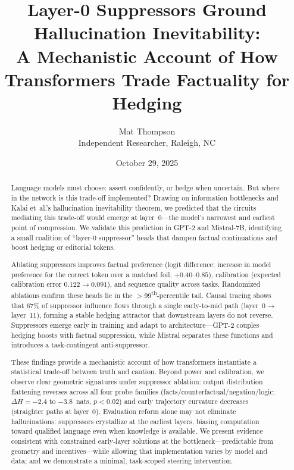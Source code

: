 \documentclass[11pt]{article}
\title{Layer-0 Suppressors Ground Hallucination Inevitability:\\A Mechanistic Account of How Transformers Trade Factuality for Hedging}
\author{Mat Thompson\\Independent Researcher, Raleigh, NC}
\date{October 29, 2025}
\begin{document}
\maketitle

\begin{abstract}
Language models must choose: assert confidently, or hedge when uncertain. But where in the network is this trade-off implemented? Drawing on information bottlenecks and Kalai et~al.'s hallucination inevitability theorem, we predicted that the circuits mediating this trade-off would emerge at layer~0—the model’s narrowest and earliest point of compression. We validate this prediction in GPT-2 and Mistral-7B, identifying a small coalition of “layer-0 suppressor” heads that dampen factual continuations and boost hedging or editorial tokens.

Ablating suppressors improves factual preference (logit difference: increase in model preference for the correct token over a matched foil, $+0.40$–$0.85$), calibration (expected calibration error $0.122\rightarrow0.091$), and sequence quality across tasks. Randomized ablations confirm these heads lie in the $>99$\textsuperscript{th}-percentile tail. Causal tracing shows that $67\%$ of suppressor influence flows through a single early-to-mid path (layer~0$\rightarrow$layer~11), forming a stable hedging attractor that downstream layers do not reverse. Suppressors emerge early in training and adapt to architecture—GPT-2 couples hedging boosts with factual suppression, while Mistral separates these functions and introduces a task-contingent anti-suppressor.

These findings provide a mechanistic account of how transformers instantiate a statistical trade-off between truth and caution. Beyond power and calibration, we observe clear geometric signatures under suppressor ablation: output distribution flattening reverses across all four probe families (facts/counterfactual/negation/logic; $\Delta H = -2.4$ to $-3.8$~nats, $p<0.02$) and early trajectory curvature decreases (straighter paths at layer~0). Evaluation reform alone may not eliminate hallucinations: suppressors crystallize at the earliest layers, biasing computation toward qualified language even when knowledge is available. We present evidence consistent with constrained early‑layer solutions at the bottleneck—predictable from geometry and incentives—while allowing that implementation varies by model and data; and we demonstrate a minimal, task-scoped steering intervention.
\end{abstract}
\end{document}
